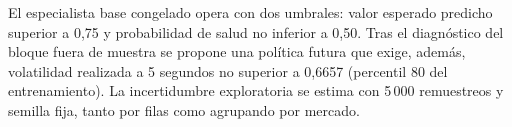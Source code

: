 El especialista base congelado opera con dos umbrales: valor esperado predicho superior a
0,75 y probabilidad de salud no inferior a 0,50. Tras el diagnóstico del bloque fuera de
muestra se propone una política futura que exige, además, volatilidad realizada a 5 segundos
no superior a 0,6657 (percentil 80 del entrenamiento). La incertidumbre exploratoria se
estima con 5\,000 remuestreos y semilla fija, tanto por filas como agrupando por mercado.
